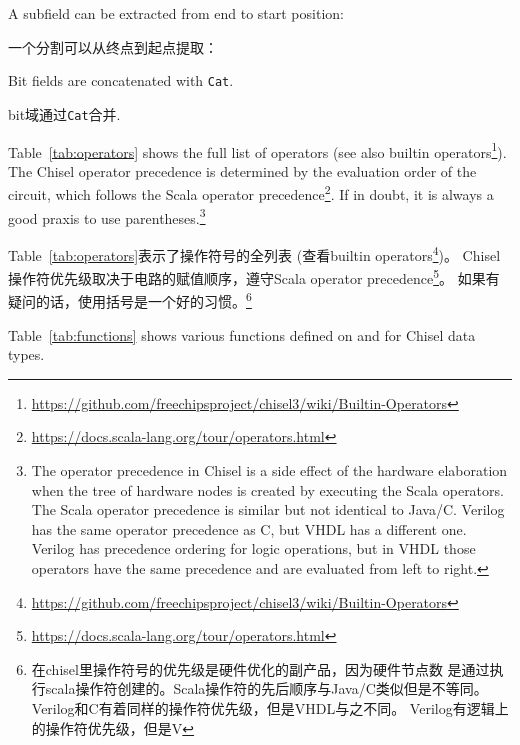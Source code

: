 \documentclass[%
    10pt,
    headinclude, footexclude,
    openright, %
    notitlepage,
    cleardoubleempty,
    headsepline,
    pointlessnumbers,
    bibtotoc, idxtotoc,
    ]{scrbook}
\newcommand{\code}[1]{{\small{\texttt{#1}}}}
\newcommand{\myref}[2]{\href{#1}{#2}}
\renewcommand{\myref}[2]{{#2}{\footnote{\url{#1}}}}
\begin{document}
\noindent A subfield can be extracted from end to start position:

\noindent 一个分割可以从终点到起点提取：


\noindent Bit fields are concatenated with \code{Cat}.

\noindent bit域通过\code{Cat}合并.


Table~\ref{tab:operators} shows the full list of operators
(see also \myref{https://github.com/freechipsproject/chisel3/wiki/Builtin-Operators}{builtin operators}).
The Chisel operator precedence is determined by the evaluation order of the circuit,
which follows the \myref{https://docs.scala-lang.org/tour/operators.html}{Scala operator precedence}.
If in doubt, it is always a good praxis to use parentheses.\footnote{The operator precedence in
Chisel is a side effect of the hardware elaboration when the tree of hardware nodes
is created by executing the Scala operators. The Scala operator precedence is similar but
not identical to Java/C. Verilog has the same operator precedence as C, but VHDL
has a different one. Verilog has precedence ordering for logic operations, but in VHDL
those operators have the same precedence and are evaluated from left to right.}

Table~\ref{tab:operators}表示了操作符号的全列表
(查看\myref{https://github.com/freechipsproject/chisel3/wiki/Builtin-Operators}{builtin operators})。
Chisel操作符优先级取决于电路的赋值顺序，遵守\myref{https://docs.scala-lang.org/tour/operators.html}{Scala operator precedence}。
如果有疑问的话，使用括号是一个好的习惯。\footnote{在chisel里操作符号的优先级是硬件优化的副产品，因为硬件节点数
是通过执行scala操作符创建的。Scala操作符的先后顺序与Java/C类似但是不等同。Verilog和C有着同样的操作符优先级，但是VHDL与之不同。
Verilog有逻辑上的操作符优先级，但是V}


Table~\ref{tab:functions} shows various functions defined on and for Chisel data types.
\end{document}
